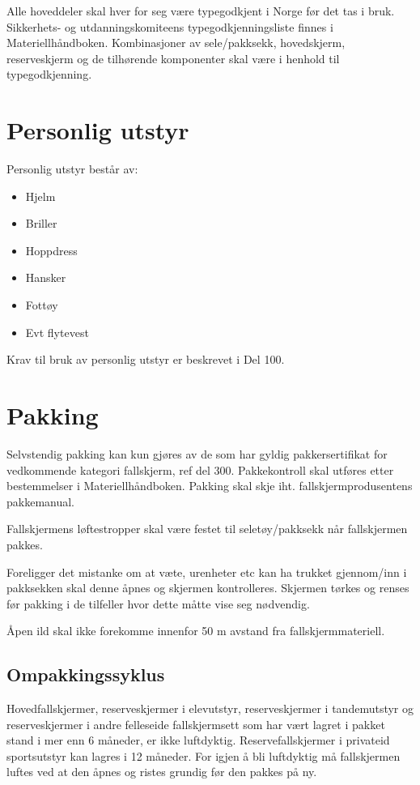Alle hoveddeler skal hver for seg være typegodkjent i Norge før det tas i bruk. Sikkerhets- og utdanningskomiteens typegodkjenningsliste finnes i Materiellhåndboken. Kombinasjoner av sele/pakksekk, hovedskjerm, reserveskjerm og de tilhørende komponenter skal være i henhold til typegodkjenning.

\section{Personlig utstyr}
Personlig utstyr består av:
\begin{itemize}
	\item Hjelm
	\item Briller
	\item Hoppdress
	\item Hansker
	\item Fottøy
	\item Evt flytevest
\end{itemize}

Krav til bruk av personlig utstyr er beskrevet i Del 100.

\section{Pakking}
Selvstendig pakking kan kun gjøres av de som har gyldig pakkersertifikat for vedkommende kategori fallskjerm, ref del 300. Pakkekontroll skal utføres etter bestemmelser i Materiellhåndboken. Pakking skal skje iht. fallskjermprodusentens pakkemanual.

Fallskjermens løftestropper skal være festet til seletøy/pakksekk når fallskjermen pakkes.

Foreligger det mistanke om at væte, urenheter etc kan ha trukket gjennom/inn i pakksekken skal denne åpnes og skjermen kontrolleres. Skjermen tørkes og renses før pakking i de tilfeller hvor dette måtte vise seg nødvendig.

Åpen ild skal ikke forekomme innenfor 50 m avstand fra fallskjermmateriell.

\subsection{Ompakkingssyklus}
Hovedfallskjermer, reserveskjermer i elevutstyr, reserveskjermer i tandemutstyr og reserveskjermer i andre felleseide fallskjermsett som har vært lagret i pakket stand i mer enn 6 måneder, er ikke luftdyktig. Reservefallskjermer i privateid sportsutstyr kan lagres i 12 måneder. For igjen å bli luftdyktig må fallskjermen luftes ved at den åpnes og ristes grundig før den pakkes på ny.

